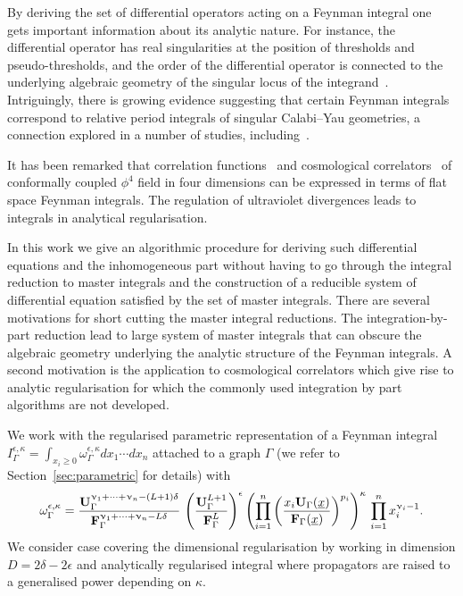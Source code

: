 \documentclass[a4paper,12pt]{article}
\numberwithin{equation}{section}
\numberwithin{figure}{section}
\begin{document}
\medskip
By deriving the set of differential operators acting on a Feynman integral one
gets important information about its analytic nature. For instance, 
the differential  operator has real singularities at the position of
 thresholds and pseudo-thresholds, and the order of the differential
operator is connected to the underlying algebraic geometry of the singular locus
of the integrand~\cite{Doran:2023yzu}. Intriguingly, there is  growing evidence suggesting that certain
Feynman integrals correspond to relative period integrals of singular
Calabi--Yau geometries, a connection explored in a number
of studies,
including~\cite{Brown:2009ta,Bloch:2014qca,Bloch:2016izu,Bourjaily:2018ycu,Bourjaily:2019hmc,Bourjaily:2018yfy,Klemm:2019dbm,Bonisch:2020qmm,Bonisch:2021yfw,Bourjaily:2022bwx,Forum:2022lpz,Duhr:2022pch,Frellesvig:2023PM,Pogel:2023zyd,Klemm:2024wtd}.

It has been remarked that correlation
functions~\cite{Heckelbacher:2022hbq}
and cosmological correlators~\cite{Heckelbacher:2022fbx,Chowdhury:2023arc}
of conformally
coupled $\phi^4$ field in four dimensions can be expressed in terms of
flat space Feynman integrals.  The regulation of ultraviolet
divergences leads to integrals in analytical regularisation.

In this work we give an algorithmic procedure for deriving such
differential equations and the inhomogeneous part without having to go through the integral
reduction to master integrals and the construction of a reducible
system of differential equation satisfied by the set of master
integrals.  There are several motivations for short cutting the master
integral reductions. The integration-by-part reduction lead to large
system of master integrals that can obscure the algebraic
geometry underlying the analytic
structure of the Feynman integrals.
A second motivation is the application to
cosmological correlators which give rise to analytic regularisation
for which the commonly used integration by part algorithms are not  developed. 

We work with the regularised parametric representation of a Feynman integral $
I_\Gamma^{\epsilon,\kappa}=\int_{x_i\geq0}  \omega_\Gamma^{\epsilon,\kappa} dx_1\cdots dx_n$ attached to a
graph $\Gamma$ (we refer to 
Section~\ref{sec:parametric} for details)
with
\begin{equation}\label{e:OmegaAnRegIntro}
  \omega^{\epsilon,\kappa}_\Gamma = { \textbf{U}_\Gamma ^{\upnu_1+\cdots+\upnu_n-(L+1)\delta}  \over \textbf{F}_\Gamma ^{\upnu_1+\cdots+\upnu_n-L\delta} }\, \left(\textbf{U}_\Gamma^{L+1}\over \textbf{F}_\Gamma^{L}\right)^{\epsilon} 
  \left(\prod_{i=1}^n \left(x_i \textbf{U}_\Gamma(\underline x)\over
      \textbf{F}_\Gamma(\underline x)\right)^{p_i}\right)^{\kappa} \, \prod_{i=1}^n x_i^{\upnu_i-1} .
\end{equation}
We consider case covering
the dimensional regularisation by working in dimension
$D=2\delta-2\epsilon$ and analytically regularised integral where
propagators are raised to a generalised power depending on $\kappa$.
\end{document}
